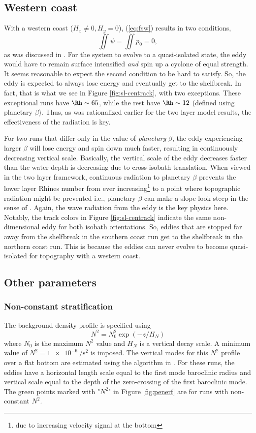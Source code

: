 \subsection{Western coast}
\label{sec-6-1}
\label{sec:west}
With a western coast ($H_x ≠ 0, H_y = 0$), (\ref{eq:fsw}) results in two conditions,
\begin{equation}
\iint ψ = \iint p_{0} = 0,
\end{equation}
as was discussed in \citet{Flierl1987}. For the system to evolve to a quasi-isolated state, the eddy would have to remain surface intensified \emph{and} spin up a cyclone of equal strength. It seems reasonable to expect the second condition to be hard to satisfy. So, the eddy is expected to always lose energy and eventually get to the shelfbreak. In fact, that is what we see in Figure \ref{fig:sl-centrack}, with two exceptions. These exceptional runs have $\Rh \sim 65$, while the rest have $\Rh \sim 12$ (defined using planetary $β$). Thus, as was rationalized earlier for the two layer model results, the effectiveness of the radiation is key.

For two runs that differ only in the value of \emph{planetary} $β$, the eddy experiencing larger $β$ will lose energy and spin down much faster, resulting in continuously decreasing vertical scale. Basically, the vertical scale of the eddy decreases faster than the water depth is decreasing due to cross-isobath translation. When viewed in the two layer framework, continuous radiation to planetary $β$ prevents the lower layer Rhines number from ever increasing\footnote{due to increasing velocity signal at the bottom} to a point where topographic radiation might be prevented i.e., planetary $β$ can make a slope look steep in the sense of \citet{LaCasce1998}. Again, the wave radiation from the eddy is the key physics here. Notably, the track colors in Figure \ref{fig:sl-centrack} indicate the same non-dimensional eddy for both isobath orientations. So, eddies that are stopped far away from the shelfbreak in the southern coast run get to the shelfbreak in the northern coast run. This is because the eddies can never evolve to become quasi-isolated for topography with a western coast.
\subsection{Other parameters}
\label{sec-6-2}
\subsubsection*{Non-constant stratification}
\label{sec-6-2-1}
\label{sec:N2}
The background density profile is specified using
\[ N^2 = N_0^2 \exp{(-z/H_N)} \]
where $N_0$ is the maximum $N^2$ value and $H_N$ is a vertical decay scale. A minimum value of $N^2=\SI{1e-6}{\per\square\second}$ is imposed. The vertical modes for this $N^2$ profile over a flat bottom are estimated using the algorithm in \citet{Chelton1998}. For these runs, the eddies have a horizontal length scale equal to the first mode baroclinic radius and vertical scale equal to the depth of the zero-crossing of the first baroclinic mode. The green points marked with "$N^2$" in Figure \ref{fig:penerf} are for runs with non-constant $N^2$.

